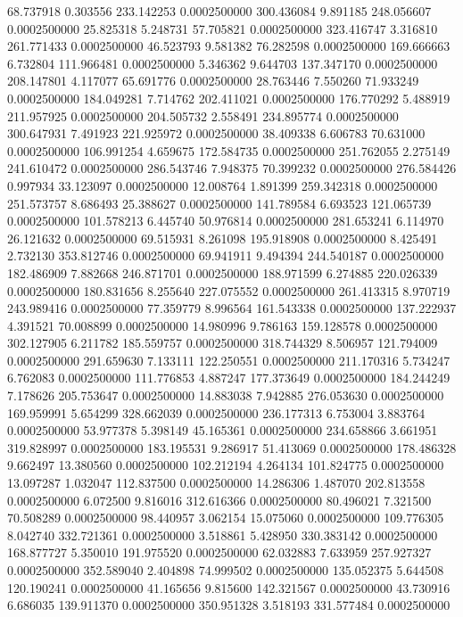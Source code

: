 68.737918 0.303556 233.142253 0.0002500000
300.436084 9.891185 248.056607 0.0002500000
25.825318 5.248731 57.705821 0.0002500000
323.416747 3.316810 261.771433 0.0002500000
46.523793 9.581382 76.282598 0.0002500000
169.666663 6.732804 111.966481 0.0002500000
5.346362 9.644703 137.347170 0.0002500000
208.147801 4.117077 65.691776 0.0002500000
28.763446 7.550260 71.933249 0.0002500000
184.049281 7.714762 202.411021 0.0002500000
176.770292 5.488919 211.957925 0.0002500000
204.505732 2.558491 234.895774 0.0002500000
300.647931 7.491923 221.925972 0.0002500000
38.409338 6.606783 70.631000 0.0002500000
106.991254 4.659675 172.584735 0.0002500000
251.762055 2.275149 241.610472 0.0002500000
286.543746 7.948375 70.399232 0.0002500000
276.584426 0.997934 33.123097 0.0002500000
12.008764 1.891399 259.342318 0.0002500000
251.573757 8.686493 25.388627 0.0002500000
141.789584 6.693523 121.065739 0.0002500000
101.578213 6.445740 50.976814 0.0002500000
281.653241 6.114970 26.121632 0.0002500000
69.515931 8.261098 195.918908 0.0002500000
8.425491 2.732130 353.812746 0.0002500000
69.941911 9.494394 244.540187 0.0002500000
182.486909 7.882668 246.871701 0.0002500000
188.971599 6.274885 220.026339 0.0002500000
180.831656 8.255640 227.075552 0.0002500000
261.413315 8.970719 243.989416 0.0002500000
77.359779 8.996564 161.543338 0.0002500000
137.222937 4.391521 70.008899 0.0002500000
14.980996 9.786163 159.128578 0.0002500000
302.127905 6.211782 185.559757 0.0002500000
318.744329 8.506957 121.794009 0.0002500000
291.659630 7.133111 122.250551 0.0002500000
211.170316 5.734247 6.762083 0.0002500000
111.776853 4.887247 177.373649 0.0002500000
184.244249 7.178626 205.753647 0.0002500000
14.883038 7.942885 276.053630 0.0002500000
169.959991 5.654299 328.662039 0.0002500000
236.177313 6.753004 3.883764 0.0002500000
53.977378 5.398149 45.165361 0.0002500000
234.658866 3.661951 319.828997 0.0002500000
183.195531 9.286917 51.413069 0.0002500000
178.486328 9.662497 13.380560 0.0002500000
102.212194 4.264134 101.824775 0.0002500000
13.097287 1.032047 112.837500 0.0002500000
14.286306 1.487070 202.813558 0.0002500000
6.072500 9.816016 312.616366 0.0002500000
80.496021 7.321500 70.508289 0.0002500000
98.440957 3.062154 15.075060 0.0002500000
109.776305 8.042740 332.721361 0.0002500000
3.518861 5.428950 330.383142 0.0002500000
168.877727 5.350010 191.975520 0.0002500000
62.032883 7.633959 257.927327 0.0002500000
352.589040 2.404898 74.999502 0.0002500000
135.052375 5.644508 120.190241 0.0002500000
41.165656 9.815600 142.321567 0.0002500000
43.730916 6.686035 139.911370 0.0002500000
350.951328 3.518193 331.577484 0.0002500000

